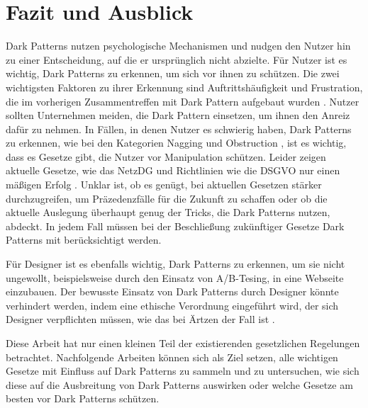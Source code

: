 \documentclass[conference,compsoc,final,a4paper]{IEEEtran}
\begin{document}
\section{Fazit und Ausblick}
Dark Patterns nutzen psychologische Mechanismen und nudgen den Nutzer hin zu einer Entscheidung, auf die er ursprünglich nicht abzielte. Für Nutzer ist es wichtig, Dark Patterns zu erkennen, um sich vor ihnen zu schützen. Die zwei wichtigsten Faktoren zu ihrer Erkennung sind Auftrittshäufigkeit und Frustration, die im vorherigen Zusammentreffen mit Dark Pattern aufgebaut wurden \autocite{M.Bhoot2020}. Nutzer sollten Unternehmen meiden, die Dark Pattern einsetzen, um ihnen den Anreiz dafür zu nehmen. In Fällen, in denen Nutzer es schwierig haben, Dark Patterns zu erkennen, wie bei den Kategorien Nagging und Obstruction \autocites{Gray_2018}{M.Bhoot2020}, ist es wichtig, dass es Gesetze gibt, die Nutzer vor Manipulation schützen. Leider zeigen aktuelle Gesetze, wie das \ac{NetzDG} und Richtlinien wie die \ac{DSGVO} nur einen mäßigen Erfolg \autocites{Nouwens2020}{Soe2020}. Unklar ist, ob es genügt, bei aktuellen Gesetzen stärker durchzugreifen, um Präzedenzfälle für die Zukunft zu schaffen \autocite{Rieger2020} oder ob die aktuelle Auslegung überhaupt genug der Tricks, die Dark Patterns nutzen, abdeckt. In jedem Fall müssen bei der Beschließung zukünftiger Gesetze Dark Patterns mit berücksichtigt werden.

Für Designer ist es ebenfalls wichtig, Dark Patterns zu erkennen, um sie nicht ungewollt, beispielsweise durch den Einsatz von A/B-Tesing, in eine Webseite einzubauen. Der bewusste Einsatz von Dark Patterns durch Designer könnte verhindert werden, indem eine ethische Verordnung eingeführt wird, der sich Designer verpflichten müssen, wie das bei Ärtzen der Fall ist \autocite{Gray_2018}.

Diese Arbeit hat nur einen kleinen Teil der existierenden gesetzlichen Regelungen betrachtet. Nachfolgende Arbeiten können sich als Ziel setzen, alle wichtigen Gesetze mit Einfluss auf Dark Patterns zu sammeln und zu untersuchen, wie sich diese auf die Ausbreitung von Dark Patterns auswirken oder welche Gesetze am besten vor Dark Patterns schützen.


\end{document}
